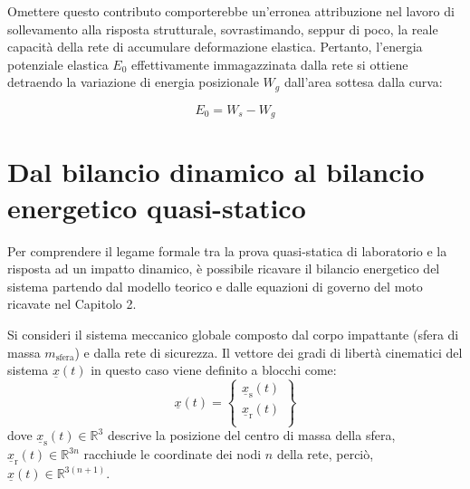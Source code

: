 Omettere questo contributo comporterebbe un'erronea attribuzione nel lavoro di sollevamento alla risposta strutturale, sovrastimando, seppur di poco, la reale capacità della rete di accumulare deformazione elastica. Pertanto, l'energia potenziale elastica $E_0$ effettivamente immagazzinata dalla rete si ottiene detraendo la variazione di energia posizionale $W_g$ dall'area sottesa dalla curva:

\begin{equation}
  E_0 = W_s - W_g
  \label{eq:energia_elastica_E0}
\end{equation}


\section{Dal bilancio dinamico al bilancio energetico quasi-statico}\label{sec:bilancio_energetico}

Per comprendere il legame formale tra la prova quasi-statica di laboratorio e la risposta ad un impatto dinamico, è possibile ricavare il bilancio energetico del sistema partendo dal modello teorico e dalle equazioni di governo del moto ricavate nel Capitolo 2.

Si consideri il sistema meccanico globale composto dal corpo impattante (sfera di massa $m_{\text{sfera}}$) e dalla rete di sicurezza. Il vettore dei gradi di libertà cinematici del sistema $\underline{x}(t)$ in questo caso viene definito a blocchi come:
\begin{equation}
    \underline{x}(t) = 
    \left\{\begin{array}{c}
    \underline{x}_{\text{s}}(t)\\
    \underline{x}_{\text{r}}(t)\\
    \end{array} \right\}
    \label{eq:vettore_sistema_dinamico}
\end{equation}
dove $\underline{x}_{\text{s}}(t) \in \mathbb{R}^3$ descrive la posizione del centro di massa della sfera, $\underline{x}_{\text{r}}(t) \in \mathbb{R}^{3n}$ racchiude le coordinate dei nodi $n$ della rete, perciò, $\underline{x}(t) \in \mathbb{R}^{3(n+1)}$.  

